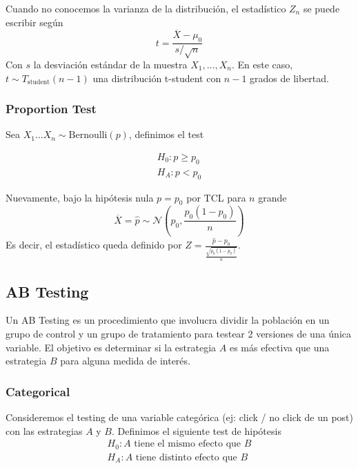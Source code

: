 Cuando no conocemos la varianza de la distribución, el estadístico $Z_n$ se puede escribir según 
$$ 
t = \frac{\overline{X} - \mu_0}{s / \sqrt{n}}
$$
Con $s$ la desviación estándar de la muestra $X_1 , \dots, X_n$. En este caso, $t \sim T_{\text{student}}(n-1)$ una distribución t-student con $n-1$ grados de libertad. 

\subsubsection{Proportion Test}

Sea $X_1 \dots X_n \sim \text{Bernoulli}(p)$, definimos el test 

\begin{equation*}
\begin{aligned}
    H_0: p \geq p_0 \\ 
    H_A: p < p_0
\end{aligned}
\end{equation*}

Nuevamente, bajo la hipótesis nula $p = p_0$ por TCL para $n$ grande
$$ 
\overline{X} = \hat{p} \sim \mathcal{N} \left ( p_0 , \frac{p_0(1-p_0)}{n} \right )
$$
Es decir, el estadístico queda definido por $Z = \frac{\hat{p} - p_0}{\frac{\sqrt{p_0(1-p_0)}}{n}}$. 

\subsection{AB Testing}

Un AB Testing es un procedimiento que involucra dividir la población en un grupo de control y un grupo de tratamiento para testear 2 versiones de una única variable. El objetivo es determinar si la estrategia $A$ es más efectiva que una estrategia $B$ para alguna medida de interés.

\subsubsection{Categorical}

Consideremos el testing de una variable categórica (ej: click / no click de un post) con las estrategias $A$ y $B$. Definimos el siguiente test de hipótesis 
\begin{equation*}
\begin{aligned}
    H_0: A \text{ tiene el mismo efecto que } B \\ 
    H_A: A \text{ tiene distinto efecto que } B
\end{aligned}
\end{equation*}

